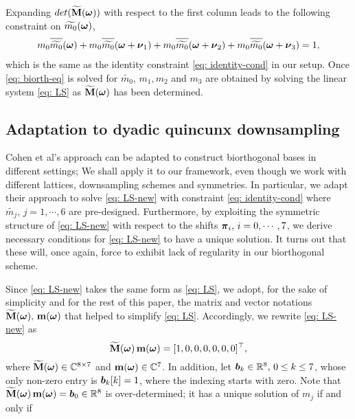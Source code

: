 Expanding $det(\widetilde{\mathbf{M}}(\boldsymbol{\omega}))$ with respect to the first column leads to the following constraint on $\widetilde{m_{0}}(\boldsymbol{\omega})$, 
\begin{align}\label{eq: biorth-eq}
m_0\sbarm{0} + m_0\sbarmn{0}{1} + m_0\sbarmn{0}{2} + m_0\sbarmn{0}{3} = 1,
\end{align}
which is the same as the identity constraint \eqref{eq: identity-cond} in our setup. 
Once \eqref{eq: biorth-eq} is solved for $\widetilde{m_0}$, $m_1,m_2$ and $m_3$ are obtained by solving the linear system \eqref{eq: LS} as $\widetilde{\mathbf{M}}(\boldsymbol{\omega})$ has been determined.

\subsection{Adaptation to dyadic quincunx downsampling}\label{subsec: adapt-cohen}

Cohen et al's approach can be adapted to construct biorthogonal bases in different settings; We shall apply it to our framework, even though we work with different lattices, downsampling schemes and symmetries. In particular, we adapt their approach to solve \eqref{eq: LS-new} with constraint \eqref{eq: identity-cond} where $\widetilde{m_j},\, j= 1,\cdots,6$ are pre-designed. Furthermore, by exploiting the symmetric structure of \eqref{eq: LS-new} with respect to the shifts $\boldsymbol{\pi}_i,\,i=0,\cdots,7$, we derive necessary conditions for \eqref{eq: LS-new} to have a unique solution. It turns out that these will, once again, force to exhibit lack of regularity in our biorthogonal scheme.

Since \eqref{eq: LS-new} takes the same form as \eqref{eq: LS}, we adopt, for the sake of simplicity and for the rest of this paper,  the matrix and vector notations $\widetilde{\mathbf{M}}(\boldsymbol{\omega}),\,\mathbf{m}(\boldsymbol{\omega}) $ that helped to simplify \eqref{eq: LS}. Accordingly, we rewrite \eqref{eq: LS-new} as  \[\widetilde{\mathbf{M}}(\boldsymbol{\omega})\, \mathbf{m} (\boldsymbol{\omega})= [1,0,0,0,0,0,0]^\top,\]  where $\widetilde{\mathbf{M}}(\boldsymbol{\omega})\in\mathbb{C}^{8\times 7}$ and $\mathbf{m}(\boldsymbol{\omega})\in\mathbb{C}^7$. In addition, let $\boldsymbol{b}_k \in\mathbb{R}^8,\, 0\leq k\leq 7$, whose only non-zero entry is $\boldsymbol{b}_k[k] = 1$, where the indexing starts with zero. Note that $\widetilde{\mathbf{M}}(\boldsymbol{\omega})\,\mathbf{m}(\boldsymbol{\omega}) = \boldsymbol{b}_0\in\mathbb{R}^8$ is over-determined; it has a unique solution of $m_j$ if and only if 

